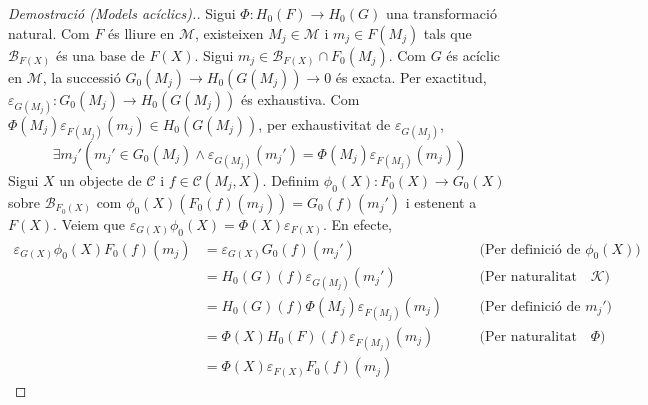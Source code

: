 \documentclass[compress]{article}
\theoremstyle{definition}
\begin{document}
\begin{proof}[Demostració (Models acíclics).]
    Sigui $\Phi:H_{0}(F)\rightarrow H_{0}(G)$ una transformació natural. Com $F$ és lliure en $\mathscr{M}$, existeixen $M_{j}\in\mathscr{M}$ i $m_{j}\in F(M_{j})$ tals que $\mathscr{B}_{F(X)}$ és una base de $F(X)$. Sigui $m_{j}\in\mathscr{B}_{F(X)}\cap F_{0}(M_{j})$. Com $G$ és acíclic en $\mathscr{M}$, la successió $G_{0}(M_{j})\rightarrow H_{0}(G(M_{j}))\rightarrow0$ és exacta. Per exactitud, $\varepsilon_{G(M_{j})}:G_{0}(M_{j})\rightarrow H_{0}(G(M_{j}))$ és exhaustiva. Com $\Phi(M_{j})\varepsilon_{F(M_{j})}(m_{j})\in H_{0}(G(M_{j}))$, per exhaustivitat de $\varepsilon_{G(M_{j})}$,
    \begin{equation*}
        \exists m_{j}'(m_{j}'\in G_{0}(M_{j})\land\varepsilon_{G(M_{j})}(m_{j}')=\Phi(M_{j})\varepsilon_{F(M_{j})}(m_{j}))
    \end{equation*}
    Sigui $X$ un objecte de $\mathscr{C}$ i $f\in\mathscr{C}(M_{j},X)$. Definim $\phi_{0}(X):F_{0}(X)\rightarrow G_{0}(X)$ sobre $\mathscr{B}_{F_{0}(X)}$ com\newline
    $\phi_{0}(X)(F_{0}(f)(m_{j}))=G_{0}(f)(m_{j}')$ i estenent a $F(X)$. Veiem que $\varepsilon_{G(X)}\phi_{0}(X)=\Phi(X)\varepsilon_{F(X)}$. En efecte,
    \begin{align*}
        \varepsilon_{G(X)}\phi_{0}(X)F_{0}(f)(m_{j})
        &=\varepsilon_{G(X)}G_{0}(f)(m_{j}')
        &\quad&\textrm{(Per definició de $\phi_{0}(X)$)}\\
        &=H_{0}(G)(f)\varepsilon_{G(M_{j})}(m_{j}')
        &\quad&\textrm{(Per naturalitat dels morfismes de $\mathscr{K}$)}\\
        &=H_{0}(G)(f)\Phi(M_{j})\varepsilon_{F(M_{j})}(m_{j})
        &\quad&\textrm{(Per definició de $m_{j}'$)}\\
        &=\Phi(X)H_{0}(F)(f)\varepsilon_{F(M_{j})}(m_{j})
        &\quad&\textrm{(Per naturalitat de $\Phi$)}\\
        &=\Phi(X)\varepsilon_{F(X)}F_{0}(f)(m_{j})

\end{align*}
\end{proof}
\end{document}

